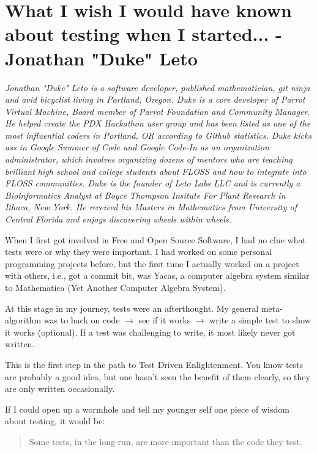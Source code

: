 \chapter{What I wish I would have known about testing when I started... -
Jonathan "Duke" Leto}

\textit{Jonathan "Duke" Leto is a software developer, published mathematician,
git ninja and avid bicyclist living in Portland, Oregon. Duke is a core developer of
Parrot Virtual Machine, Board member of Parrot Foundation and Community Manager.
He helped create the PDX Hackathon user group and has been listed as one of the
most influential coders in Portland, OR according to Github statistics.
\newline
Duke kicks ass in Google Summer of Code and Google Code-In as an organization
administrator, which involves organizing dozens of mentors who are teaching
brilliant high school and college students about FLOSS and how to integrate
into FLOSS communities.
\newline
Duke is the founder of Leto Labs LLC and is currently a Bioinformatics
Analyst at Boyce Thompson Insitute For Plant Research in Ithaca, New York. He
received his Masters in Mathematics from University of Central Florida and
enjoys discovering wheels within wheels.}

When I first got involved in Free and Open Source Software, I had no clue what
tests were or why they were important. I had worked on some personal programming
projects before, but the first time I actually worked on a project with others,
i.e., got a commit bit, was Yacas, a computer algebra system similar to
Mathematica (Yet Another Computer Algebra System).

At this stage in my journey, tests were an afterthought. My general
meta-algorithm was to hack on code $\rightarrow$ see if it works $\rightarrow$
write a simple test to show it works (optional). If a test was challenging to
write, it most likely never got written.

This is the first step in the path to Test Driven Enlightenment. You know tests
are probably a good idea, but one hasn't seen the benefit of them clearly, so
they are only written occasionally.

If I could open up a wormhole and tell my younger self one piece of wisdom about
testing, it would be:
\begin{quote}
Some tests, in the long-run, are more important than the code they test.        
                                                               \end{quote}

